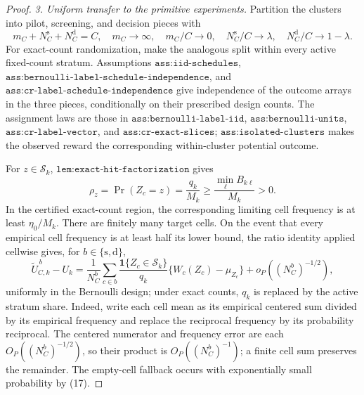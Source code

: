 \documentclass{article}
\begin{document}
\begin{proof}
\emph{3. Uniform transfer to the primitive experiments.}
Partition the clusters into pilot, screening, and decision pieces with
\[
m_C+N_C^{\mathrm s}+N_C^{\mathrm d}=C,
\quad m_C\to\infty,
\quad m_C/C\to0,
\quad N_C^{\mathrm s}/C\to\lambda,
\quad N_C^{\mathrm d}/C\to1-\lambda.                              \tag{16}
\]
For exact-count randomization, make the analogous split within every active fixed-count stratum.  Assumptions \(\texttt{ass:iid-schedules}\), \(\texttt{ass:bernoulli-label-schedule-independence}\), and \(\texttt{ass:cr-label-schedule-independence}\) give independence of the outcome arrays in the three pieces, conditionally on their prescribed design counts.  The assignment laws are those in \(\texttt{ass:bernoulli-label-iid}\), \(\texttt{ass:bernoulli-units}\), \(\texttt{ass:cr-label-vector}\), and \(\texttt{ass:cr-exact-slices}\); \(\texttt{ass:isolated-clusters}\) makes the observed reward the corresponding within-cluster potential outcome.

For \(z\in\mathcal S_k\), \(\texttt{lem:exact-hit-factorization}\) gives
\[
\rho_z=\Pr(Z_c=z)=\frac{q_k}{M_k}
\geq\frac{\min_\ell B_{k\ell}}{M_k}>0.                           \tag{17}
\]
In the certified exact-count region, the corresponding limiting cell frequency is at least \(\eta_0/M_k\).  There are finitely many target cells.  On the event that every empirical cell frequency is at least half its lower bound, the ratio identity applied cellwise gives, for \(b\in\{\mathrm s,\mathrm d\}\),
\[
\widetilde U_{C,k}^{\,b}-U_k
=\frac1{N_C^b}\sum_{c\in b}
\frac{\mathbf1\{Z_c\in\mathcal S_k\}}{q_k}
\{W_c(Z_c)-\mu_{Z_c}\}+o_P((N_C^b)^{-1/2}),                     \tag{18}
\]
uniformly in the Bernoulli design; under exact counts, \(q_k\) is replaced by the active stratum share.  Indeed, write each cell mean as its empirical centered sum divided by its empirical frequency and replace the reciprocal frequency by its probability reciprocal.  The centered numerator and frequency error are each \(O_P((N_C^b)^{-1/2})\), so their product is \(O_P((N_C^b)^{-1})\); a finite cell sum preserves the remainder.  The empty-cell fallback occurs with exponentially small probability by (17).


\end{proof}
\end{document}
